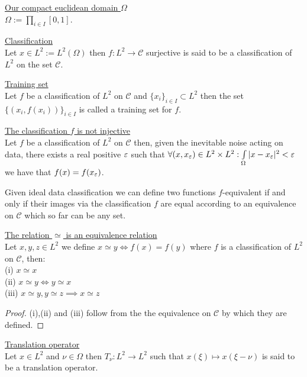 \documentclass[../main.tex]{subfiles}
\begin{document}
\begin{defn}\underline{Our compact euclidean domain $\Omega$}\\
$\Omega := \prod_{i \in I}[0,1]$.
\end{defn}

\begin{defn}\underline{Classification}\\
Let $x \in L^2 := L^2(\Omega)$ then $f : L^2 \to \mathcal{C}$ surjective
is said to be a classification of $L^2$ on the set $\mathcal{C}$.
\end{defn}

\begin{defn}\underline{Training set}\\
Let $f$ be a classification of $L^2$ on $\mathcal{C}$ and $\{x_i\}_{i \in I}\subset L^2$
then the set $\{(x_i,f(x_i))\}_{i \in I}$ is called a training set for $f$.
\end{defn}

\begin{prop}\underline{The classification $f$ is not injective}\\
Let $f$ be a classification of $L^2$ on $\mathcal{C}$ then, given the inevitable noise acting on data,
there exists a real positive $\varepsilon$ such that $\forall (x,x_\varepsilon) \in L^2\times L^2: \int\limits_\Omega{|x-x_\varepsilon|^2}<\varepsilon$
we have that $f(x)=f(x_\varepsilon)$.
\end{prop}

Given ideal data classification we can define two functions $f$-equivalent if and only if 
their images via the classification $f$ are equal according to an equivalence on $\mathcal{C}$ which so far can be any set.

\begin{prop}\underline{The relation $\simeq$ is an equivalence relation}\\
Let $x,y,z \in L^2$ we define $x\simeq y \iff f(x)=f(y)$ where $f$ is a classification of $L^2$ on $\mathcal{C}$,
then:\\
(i) $x \simeq x$\\
(ii) $x \simeq y \iff y \simeq x$\\
(iii) $x \simeq y, y \simeq z \implies x \simeq z$
\end{prop}
\begin{proof}
(i),(ii) and (iii) follow from the the equivalence on $\mathcal{C}$ by which they are defined.
\end{proof}

\begin{defn}\underline{Translation operator}\\
Let $x \in L^2$ and $\nu \in \Omega$ then $T_\nu:L^2 \to L^2$ such that $x(\xi) \mapsto x(\xi - \nu)$
is said to be a translation operator.
\end{defn}
\end{document}
